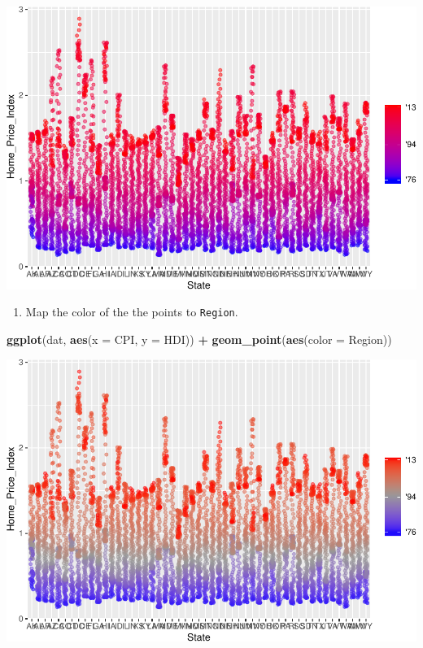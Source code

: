 \documentclass[
]{book}
\newenvironment{Shaded}{\begin{snugshade}}{\end{snugshade}}
\newcommand{\DataTypeTok}[1]{\textcolor[rgb]{0.13,0.29,0.53}{#1}}
\newcommand{\KeywordTok}[1]{\textcolor[rgb]{0.13,0.29,0.53}{\textbf{#1}}}
\newcommand{\NormalTok}[1]{#1}
\newcommand{\OperatorTok}[1]{\textcolor[rgb]{0.81,0.36,0.00}{\textbf{#1}}}
\newcommand{\StringTok}[1]{\textcolor[rgb]{0.31,0.60,0.02}{#1}}
\providecommand{\tightlist}{%
  \setlength{\itemsep}{0pt}\setlength{\parskip}{0pt}}
\begin{document}
\begin{alert}
\includegraphics{R/Rgraphics/figures/unnamed-chunk-172-1.pdf}

\begin{enumerate}
\def\labelenumi{\arabic{enumi}.}
\setcounter{enumi}{2}
\tightlist
\item
  Map the color of the the points to \texttt{Region}.
\end{enumerate}

\begin{Shaded}
\begin{Highlighting}[]
\KeywordTok{ggplot}\NormalTok{(dat, }\KeywordTok{aes}\NormalTok{(}\DataTypeTok{x =}\NormalTok{ CPI, }\DataTypeTok{y =}\NormalTok{ HDI)) }\OperatorTok{+}
\StringTok{  }\KeywordTok{geom\_point}\NormalTok{(}\KeywordTok{aes}\NormalTok{(}\DataTypeTok{color =}\NormalTok{ Region))}
\end{Highlighting}
\end{Shaded}

\includegraphics{R/Rgraphics/figures/unnamed-chunk-173-1.pdf}


\end{alert}
\end{document}
